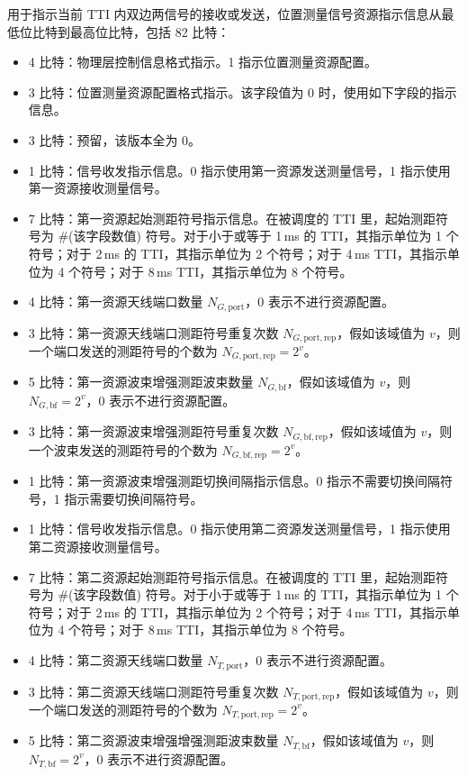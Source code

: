 \documentclass[11pt,a4paper]{ctexart}
\begin{document}
用于指示当前 TTI 内双边两信号的接收或发送，位置测量信号资源指示信息从最低位比特到最高位比特，包括 82 比特：
\begin{itemize}[nosep]
  \item 4 比特：物理层控制信息格式指示。1 指示位置测量资源配置。
  \item 3 比特：位置测量资源配置格式指示。该字段值为 0 时，使用如下字段的指示信息。
  \item 3 比特：预留，该版本全为 0。
  \item 1 比特：信号收发指示信息。0 指示使用第一资源发送测量信号，1 指示使用第一资源接收测量信号。
  \item 7 比特：第一资源起始测距符号指示信息。在被调度的 TTI 里，起始测距符号为 \#(该字段数值) 符号。对于小于或等于 1\,ms 的 TTI，其指示单位为 1 个符号；对于 2\,ms 的 TTI，其指示单位为 2 个符号；对于 4\,ms TTI，其指示单位为 4 个符号；对于 8\,ms TTI，其指示单位为 8 个符号。
  \item 4 比特：第一资源天线端口数量 $N_{G,\mathrm{port}}$，0 表示不进行资源配置。
  \item 3 比特：第一资源天线端口测距符号重复次数 $N_{G,\mathrm{port,rep}}$，假如该域值为 $v$，则一个端口发送的测距符号的个数为 $N_{G,\mathrm{port,rep}} = 2^v$。
  \item 5 比特：第一资源波束增强测距波束数量 $N_{G,\mathrm{bf}}$，假如该域值为 $v$，则 $N_{G,\mathrm{bf}} = 2^v$，0 表示不进行资源配置。
  \item 3 比特：第一资源波束增强测距符号重复次数 $N_{G,\mathrm{bf,rep}}$，假如该域值为 $v$，则一个波束发送的测距符号的个数为 $N_{G,\mathrm{bf,rep}} = 2^v$。
  \item 1 比特：第一资源波束增强测距切换间隔指示信息。0 指示不需要切换间隔符号，1 指示需要切换间隔符号。
  \item 1 比特：信号收发指示信息。0 指示使用第二资源发送测量信号，1 指示使用第二资源接收测量信号。
  \item 7 比特：第二资源起始测距符号指示信息。在被调度的 TTI 里，起始测距符号为 \#(该字段数值) 符号。对于小于或等于 1\,ms 的 TTI，其指示单位为 1 个符号；对于 2\,ms 的 TTI，其指示单位为 2 个符号；对于 4\,ms TTI，其指示单位为 4 个符号；对于 8\,ms TTI，其指示单位为 8 个符号。
  \item 4 比特：第二资源天线端口数量 $N_{T,\mathrm{port}}$，0 表示不进行资源配置。
  \item 3 比特：第二资源天线端口测距符号重复次数 $N_{T,\mathrm{port,rep}}$，假如该域值为 $v$，则一个端口发送的测距符号的个数为 $N_{T,\mathrm{port,rep}} = 2^v$。
  \item 5 比特：第二资源波束增强增强测距波束数量 $N_{T,\mathrm{bf}}$，假如该域值为 $v$，则 $N_{T,\mathrm{bf}} = 2^v$，0 表示不进行资源配置。

\end{itemize}
\end{document}
